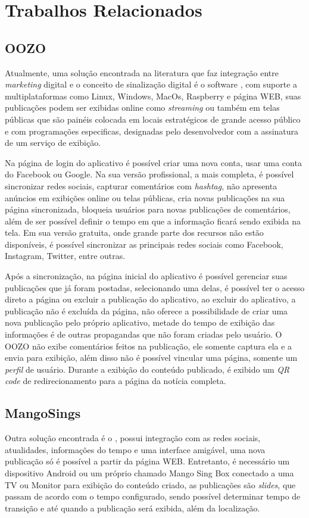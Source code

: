 \chapter[Trabalhos Relacionados]{Trabalhos Relacionados}
\section{OOZO}
Atualmente, uma solução encontrada na literatura que faz integração entre \textit{marketing} digital e o conceito de sinalização digital é o software \cite{oozo2017}, com suporte a multiplataformas como Linux, Windows, MacOs, Raspberry e página WEB, suas publicações podem ser exibidas online como \textit{streaming} ou também em telas públicas que são painéis colocada em locais estratégicos de grande acesso público e com programações especificas, designadas pelo desenvolvedor com a assinatura de um serviço de exibição.

Na página de login do aplicativo é possível criar uma nova conta, usar uma conta do Facebook ou Google. Na sua versão profissional, a mais completa, é possível sincronizar redes sociais, capturar comentários com \textit{hashtag}, não apresenta anúncios em exibições online ou telas públicas, cria novas publicações na sua página sincronizada, bloqueia usuários para novas publicações de comentários, além de ser possível definir o tempo em que a informação ficará sendo exibida na tela. Em sua versão gratuita, onde grande parte dos recursos não estão disponíveis, é possível sincronizar as principais redes sociais como Facebook, Instagram, Twitter, entre outras. 

Após a sincronização, na página inicial do aplicativo é possível gerenciar suas publicações que já foram postadas, selecionando uma delas, é possível ter o acesso direto a página ou excluir a publicação do aplicativo, ao excluir do aplicativo, a publicação não é excluída da página, não oferece a possibilidade de criar uma nova publicação pelo próprio aplicativo, metade do tempo de exibição das informações é de outras propagandas que não foram criadas pelo usuário. O OOZO não exibe comentários feitos na publicação, ele somente captura ela e a envia para exibição, além disso não é possível vincular uma página, somente um \textit{perfil} de usuário. Durante a exibição do conteúdo publicado, é exibido um \textit{QR code} de redirecionamento para a página da notícia completa.

\section{MangoSings}
Outra solução encontrada é o \cite{mango2017}, possui integração com as redes sociais, atualidades, informações do tempo e uma interface amigável, uma nova publicação só é possível a partir da página WEB. Entretanto, é necessário um dispositivo Android ou um próprio chamado Mango Sing Box conectado a uma TV ou Monitor para exibição do conteúdo criado, as publicações são \textit{slides}, que passam de acordo com o tempo configurado, sendo possível determinar tempo de transição e até quando a publicação será exibida, além da localização. 

